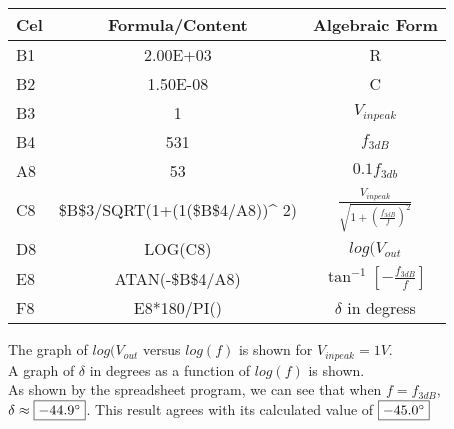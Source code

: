 \documentclass{report}
\begin{document}
\begin{tabular}{| l | c | c |}
  \hline
  Cel & Formula/Content & Algebraic Form \\
  \hline
  B1 & 2.00E+03 & R \\
  \hline
  B2 & 1.50E-08 & C \\
  \hline
  B3 & 1 & $V_{in peak}$\\
  \hline
  B4 & 531 & $f_{3dB}$\\
  \hline
  A8 & 53 & $0.1f_{3db}$\\
  \hline
  C8 & \$B\$3/SQRT(1+(1(\$B\$4/A8))\^{} 2) & $\frac{V_{in peak}}{\sqrt{1 + \left( \frac{f_{3dB}}{f} \right)^2}}$\\
  \hline
  D8 & LOG(C8) & $log(V_{out}$\\
  \hline
  E8 & ATAN(-\$B\$4/A8) & $\tan^{-1}\left[ -\frac{f_{3dB}}{f} \right]$\\
  \hline
  F8 & E8*180/PI() & $\delta$ in degress\\
  \hline
\end{tabular}

The graph of $log(V_{out}$ versus $log(f)$ is shown for $V_{in peak} = 1V$.\\
A graph of $\delta$ in degrees as a function of $log(f)$ is shown.\\
As shown by the spreadsheet program, we can see that when $f = f_{3dB}$, $\delta \approx \fbox{$-44.9^{\circ}$}$. This result agrees with its calculated value of $\fbox{$-45.0^{\circ}$}$
\end{document}

